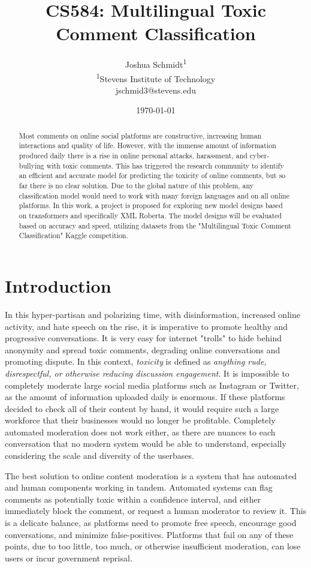 \documentclass{article}
\title{CS584: Multilingual Toxic Comment Classification} %
\author{
Joshua Schmidt\textsuperscript{1}\\
\textsuperscript{1}{Stevens Institute of Technology}\\
jschmid3@stevens.edu
}
\date{\today}
\begin{document}
\maketitle
\begin{abstract}

Most comments on online social platforms are constructive, increasing human interactions and quality of life. However, with the immense amount of information produced daily there is a rise in online personal attacks, harassment, and cyber-bullying with toxic comments. This has triggered the research community to identify an efficient and accurate model for predicting the toxicity of online comments, but so far there is no clear solution. Due to the global nature of this problem, any classification model would need to work with many foreign languages and on all online platforms. In this work, a project is proposed for exploring new model designs based on transformers and specifically XML Roberta. The model designs will be evaluated based on accuracy and speed, utilizing datasets from the "Multilingual Toxic Comment Classification" Kaggle competition.

\end{abstract}

\section{Introduction}

In this hyper-partisan and polarizing time, with disinformation, increased online activity, and hate speech on the rise, it is imperative to promote healthy and progressive conversations. It is very easy for internet "trolls" to hide behind anonymity and spread toxic comments, degrading online conversations and promoting dispute. In this context, \textit{toxicity} is defined as \textit{anything rude, disrespectful, or otherwise reducing discussion engagement}. It is impossible to completely moderate large social media platforms such as Instagram or Twitter, as the amount of information uploaded daily is enormous. If these platforms decided to check all of their content by hand, it would require such a large workforce that their businesses would no longer be profitable. Completely automated moderation does not work either, as there are nuances to each conversation that no modern system would be able to understand, especially considering the scale and diversity of the userbases.

The best solution to online content moderation is a system that has automated and human components working in tandem. Automated systems can flag comments as potentially toxic within a confidence interval, and either immediately block the comment, or request a human moderator to review it. This is a delicate balance, as platforms need to promote free speech, encourage good conversations, and minimize false-positives. Platforms that fail on any of these points, due to too little, too much, or otherwise insufficient moderation, can lose users or incur government reprisal.
\end{document}
